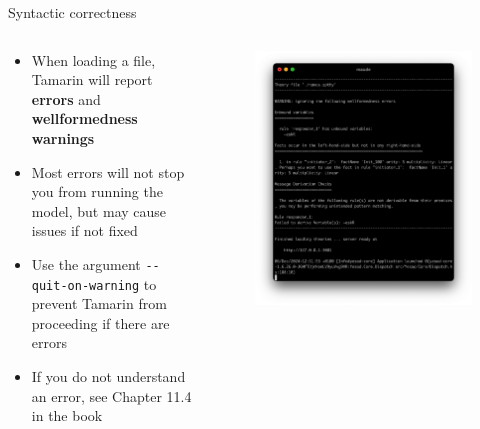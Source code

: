 \documentclass[11pt,aspectratio=169]{beamer}
\begin{document}
\begin{frame}[fragile]{Syntactic correctness}
    \begin{columns}
        \begin{column}{0.6\textwidth}
            \begin{itemize}
                \item When loading a file, Tamarin will report \textbf{errors} 
                      and \textbf{wellformedness warnings}
                \item Most errors will not stop you from running the model, but 
                      may cause issues if not fixed
                \item Use the argument \verb|--quit-on-warning| to prevent 
                      Tamarin from proceeding if there are errors
                \item If you do not understand an error, see Chapter 11.4 in 
                      the book
            \end{itemize}
        \end{column}
        \begin{column}{0.4\textwidth}
            \begin{figure}
                \includegraphics[width=\textwidth]
                    {./figures/lecture_6/wellformedness_conditions}
            \end{figure}
        \end{column}
    \end{columns}
\end{frame}
\end{document}

